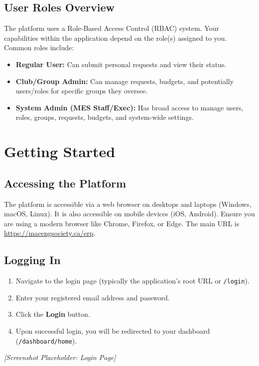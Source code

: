 \documentclass{article}
\begin{document}
\subsection{User Roles Overview}
The platform uses a Role-Based Access Control (RBAC) system. Your capabilities within the application depend on the role(s) assigned to you. Common roles include:
\begin{itemize}
    \item \textbf{Regular User:} Can submit personal requests and view their status.
    \item \textbf{Club/Group Admin:} Can manage requests, budgets, and potentially users/roles for specific groups they oversee.
    \item \textbf{System Admin (MES Staff/Exec):} Has broad access to manage users, roles, groups, requests, budgets, and system-wide settings.
\end{itemize}

\section{Getting Started}

\subsection{Accessing the Platform}
The \progname{} platform is accessible via a web browser on desktops and laptops (Windows, macOS, Linux). It is also accessible on mobile devices (iOS, Android). Ensure you are using a modern browser like Chrome, Firefox, or Edge. The main URL is \href{https://macengsociety.ca/erp}{https://macengsociety.ca/erp}.

\subsection{Logging In}
\begin{enumerate}
    \item Navigate to the login page (typically the application's root URL or \texttt{/login}).
    \item Enter your registered email address and password.
    \item Click the \textbf{Login} button.
    \item Upon successful login, you will be redirected to your dashboard (\texttt{/dashboard/home}).
\end{enumerate}
\textit{[Screenshot Placeholder: Login Page]}
\end{document}
